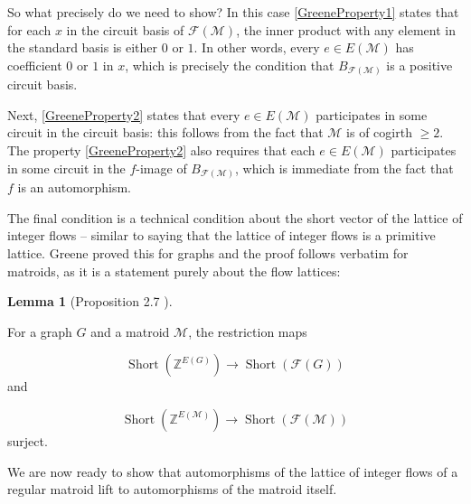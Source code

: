 \documentclass[12pt]{report}
\theoremstyle{definition}
\newtheorem{lemma}[theorem]{Lemma}
\DeclareMathOperator{\Short}{Short}
\def\Z{\mathbb Z}
\def\calF{\mathcal F}
\def\calM{\mathcal M}
\theoremstyle{upright}
\begin{document}
\begin{center}

    
\end{center}

So what precisely do we need to show?
In this case \cref{GreeneProperty1} states that for each $x$ in the circuit basis of $\calF(\calM)$, the inner product with any element in the standard basis is either $0$ or $1$. In other words, every $e\in E(\calM)$ has coefficient $0$ or $1$ in $x$, which is precisely the condition that $B_{\calF(\calM)}$ is a positive circuit basis.

Next, \cref{GreeneProperty2} states that every $e\in E(\calM)$ participates in some circuit in the circuit basis: this follows from the fact that $\calM$ is of cogirth $\geq 2$.
The property \cref{GreeneProperty2} also requires that each $e\in E(\calM)$ participates in some circuit in the $f$-image of $B_{\calF(\calM)}$, which is immediate from the fact that $f$ is an automorphism. 

The final condition is a technical condition about the short vector of the lattice of integer flows -- similar to saying that the lattice of integer flows is a primitive lattice.
Greene proved this for graphs \cite[Proposition 2.7]{greene2013lattices} and the proof follows verbatim for matroids, as it is a statement purely about the flow lattices:

\begin{lemma}[Proposition 2.7 \cite{greene2013lattices}]\label{thm:Short}

    For a graph $G$ and a matroid $\calM$, the restriction maps
    
    \[\Short\left(\Z^{E(G)}\right)\to\Short\left(\calF(G)\right)\]
    and

    \[\Short\left(\Z^{E(\calM)}\right)\to\Short\left(\calF(\calM)\right)\]
    surject.
    
\end{lemma}

We are now ready to show that automorphisms of the lattice of integer flows of a regular matroid lift to automorphisms of the matroid itself.
\end{document}
